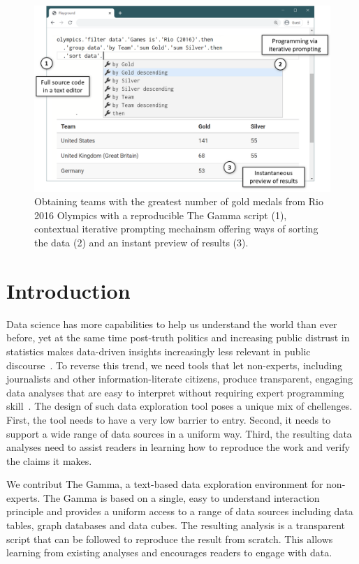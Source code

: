 \documentclass[manuscript,review,anonymous]{acmart}
\begin{document}
\maketitle

\begin{figure}
\includegraphics[width=.6\columnwidth]{figures/thegamma-annot}
\caption{Obtaining teams with the greatest number of gold medals from Rio 2016
Olympics with a reproducible The Gamma script (1), contextual iterative prompting mechainsm
offering ways of sorting the data (2) and an instant preview of results (3).}
\label{fig:thegamma}
\end{figure}


\section{Introduction}
Data science has more capabilities to help us understand the world than ever before, yet at the
same time post-truth politics and increasing public distrust in statistics makes data-driven insights
increasingly less relevant in public discourse~\cite{howstatslost}. To reverse this trend, we
need tools that let non-experts, including journalists and other information-literate citizens,
produce transparent, engaging data analyses that are easy to interpret without requiring expert
programming skill~\cite{ddj}. The design of such data exploration tool poses a unique mix of chellenges.
First, the tool needs to have a very low barrier to entry. Second, it needs to support a wide
range of data sources in a uniform way. Third, the resulting data analyses need to assist
readers in learning how to reproduce the work and verify the claims it makes.

We contribut The Gamma, a text-based data exploration environment for non-experts. The Gamma
is based on a single, easy to understand interaction principle and provides a uniform
access to a range of data sources including data tables, graph databases and data cubes.
The resulting analysis is a transparent script that can be followed to reproduce the
result from scratch. This allows learning from existing analyses and encourages readers
to engage with data.
\end{document}
